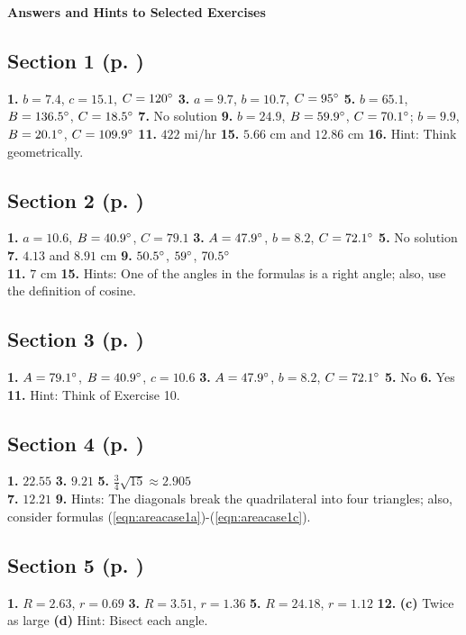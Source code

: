 \textsf{\textbf{\Large Answers and Hints to Selected Exercises}}
\begin{multicols}{2}
\subsection*{Section 1 (p. \pageref{sec2dot1})}
\textbf{1.} $b = 7.4$, $c = 15.1$, $C = 120^\circ$ \quad \textbf{3.} $a = 9.7$, $b = 10.7$, $C =
95^\circ$ \quad \textbf{5.} $b = 65.1$, $B = 136.5^\circ$, $C = 18.5^\circ$ \quad
\textbf{7.} No solution \quad \textbf{9.} $b = 24.9$, $B = 59.9^\circ$, $C = 70.1^\circ$;
$b = 9.9$, $B = 20.1^\circ$, $C = 109.9^\circ$ \quad \textbf{11.} $422$ mi/hr \quad \textbf{15.}
$5.66$ cm and $12.86$ cm \quad \textbf{16.} Hint: Think geometrically.
\subsection*{Section 2 (p. \pageref{sec2dot2})}
\textbf{1.} $a = 10.6$, $B = 40.9^\circ$, $C = 79.1$ \quad \textbf{3.} $A = 47.9^\circ$,
$b = 8.2$, $C = 72.1^\circ$ \quad \textbf{5.} No solution \quad \textbf{7.} $4.13$ and $8.91$ cm
\quad \textbf{9.} $50.5^\circ$, $59^\circ$, $70.5^\circ$\\\textbf{11.} $7$ cm \quad
\textbf{15.} Hints: One of the angles in the formulas is a right angle; also, use the definition of
cosine.
\subsection*{Section 3 (p. \pageref{sec2dot3})}
\textbf{1.} $A = 79.1^\circ$, $B = 40.9^\circ$, $c = 10.6$ \quad \textbf{3.} $A = 47.9^\circ$,
$b = 8.2$, $C = 72.1^\circ$ \quad \textbf{5.} No \quad \textbf{6.} Yes \quad \textbf{11.} Hint:
Think of Exercise 10.
\subsection*{Section 4 (p. \pageref{sec2dot4})}
\textbf{1.} $22.55$ \quad \textbf{3.} $9.21$ \quad \textbf{5.} $\frac{3}{4}\sqrt{15}
\approx 2.905$\\\textbf{7.} $12.21$ \quad \textbf{9.} Hints: The diagonals break the quadrilateral
into four triangles; also, consider formulas (\ref{eqn:areacase1a})-(\ref{eqn:areacase1c}).
\subsection*{Section 5 (p. \pageref{sec2dot5})}
\textbf{1.} $R = 2.63$, $r = 0.69$ \quad \textbf{3.} $R = 3.51$, $r = 1.36$ \quad
\textbf{5.} $R = 24.18$, $r = 1.12$ \quad \textbf{12.} \textbf{(c)} Twice as large
\textbf{(d)} Hint: Bisect each angle.

\end{multicols}